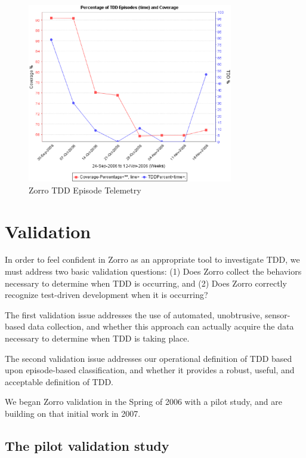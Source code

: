 \documentclass[11pt,twocolumn]{article}
\begin{document}
\begin{figure}[th]
  \center
  \includegraphics[width=0.80\textwidth]{zorro-tdd-coverage-2.eps}
  \caption{Zorro TDD Episode Telemetry}
  \label{fig:Analysis-Telemetry}
\end{figure} 


\section{Validation}
\label{sec:validation}

In order to feel confident in Zorro as an appropriate tool to investigate
TDD, we must address two basic validation questions: (1) Does Zorro collect
the behaviors necessary to determine when TDD is occurring, and (2) Does
Zorro correctly recognize test-driven development when it is occurring?

The first validation issue addresses the use of automated, unobtrusive,
sensor-based data collection, and whether this approach can actually
acquire the data necessary to determine when TDD is taking place.

The second validation issue addresses our operational definition of TDD
based upon episode-based classification, and whether it provides a robust,
useful, and acceptable definition of TDD.

We began Zorro validation in the Spring of 2006 with a pilot study, and 
are building on that initial work in 2007.

\subsection{The pilot validation study}
\end{document}
